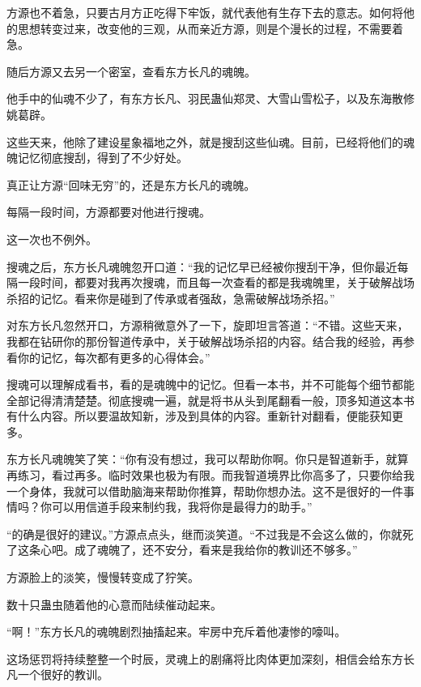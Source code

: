 
\begin{this_body}



方源也不着急，只要古月方正吃得下牢饭，就代表他有生存下去的意志。如何将他的思想转变过来，改变他的三观，从而亲近方源，则是个漫长的过程，不需要着急。

随后方源又去另一个密室，查看东方长凡的魂魄。

他手中的仙魂不少了，有东方长凡、羽民蛊仙郑灵、大雪山雪松子，以及东海散修姚葛辟。

这些天来，他除了建设星象福地之外，就是搜刮这些仙魂。目前，已经将他们的魂魄记忆彻底搜刮，得到了不少好处。

真正让方源“回味无穷”的，还是东方长凡的魂魄。

每隔一段时间，方源都要对他进行搜魂。

这一次也不例外。

搜魂之后，东方长凡魂魄忽开口道：“我的记忆早已经被你搜刮干净，但你最近每隔一段时间，都要对我再次搜魂，而且每一次查看的都是我魂魄里，关于破解战场杀招的记忆。看来你是碰到了传承或者强敌，急需破解战场杀招。”

对东方长凡忽然开口，方源稍微意外了一下，旋即坦言答道：“不错。这些天来，我都在钻研你的那份智道传承中，关于破解战场杀招的内容。结合我的经验，再参看你的记忆，每次都有更多的心得体会。”

搜魂可以理解成看书，看的是魂魄中的记忆。但看一本书，并不可能每个细节都能全部记得清清楚楚。彻底搜魂一遍，就是将书从头到尾翻看一般，顶多知道这本书有什么内容。所以要温故知新，涉及到具体的内容。重新针对翻看，便能获知更多。

东方长凡魂魄笑了笑：“你有没有想过，我可以帮助你啊。你只是智道新手，就算再练习，看过再多。临时效果也极为有限。而我智道境界比你高多了，只要你给我一个身体，我就可以借助脑海来帮助你推算，帮助你想办法。这不是很好的一件事情吗？你可以用信道手段来制约我，我将你是最得力的助手。”

“的确是很好的建议。”方源点点头，继而淡笑道。“不过我是不会这么做的，你就死了这条心吧。成了魂魄了，还不安分，看来是我给你的教训还不够多。”

方源脸上的淡笑，慢慢转变成了狞笑。

数十只蛊虫随着他的心意而陆续催动起来。

“啊！”东方长凡的魂魄剧烈抽搐起来。牢房中充斥着他凄惨的嚎叫。

这场惩罚将持续整整一个时辰，灵魂上的剧痛将比肉体更加深刻，相信会给东方长凡一个很好的教训。


\end{this_body}
